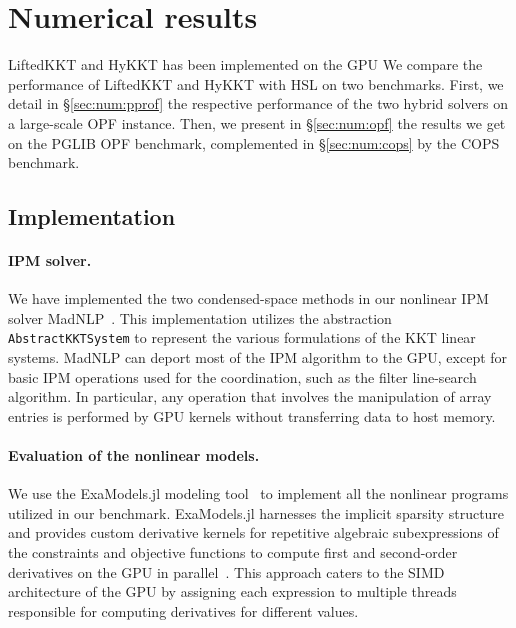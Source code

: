 \section{Numerical results}
LiftedKKT and HyKKT has been implemented on the GPU
We compare the performance of LiftedKKT and HyKKT with HSL on two benchmarks.
First, we detail in \S\ref{sec:num:pprof} the respective performance of the two hybrid solvers
on a large-scale OPF instance. Then, we present in \S\ref{sec:num:opf}
the results we get on the PGLIB OPF benchmark, complemented in \S\ref{sec:num:cops} by
the COPS benchmark.

\subsection{Implementation}

\paragraph{IPM solver.}
We have implemented the two condensed-space methods in our nonlinear IPM solver MadNLP~\cite{shin2021graph}.
This implementation utilizes the abstraction {\tt AbstractKKTSystem} to represent the various formulations of the KKT linear systems.
MadNLP can deport most of the IPM algorithm to the GPU, except for basic IPM operations used for the coordination, such as the filter line-search algorithm.
In particular, any operation that involves the manipulation of array entries is performed by GPU kernels without transferring data to host memory.

\paragraph{Evaluation of the nonlinear models.}
We use the ExaModels.jl modeling tool~\cite{shin2023accelerating} to implement all the nonlinear programs utilized in our benchmark.
ExaModels.jl harnesses the implicit sparsity structure and provides custom derivative kernels for repetitive algebraic subexpressions of the constraints and objective functions to compute first and second-order derivatives on the GPU in parallel~\cite{bischof1991exploiting,enzyme2021}.
This approach caters to the SIMD architecture of the GPU by assigning each expression to multiple threads responsible for computing derivatives for different values.

